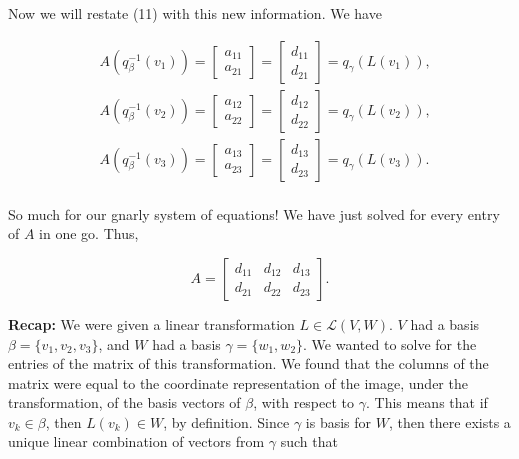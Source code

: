 \documentclass[12pt, a4paper]{article}
\begin{document}
 \noindent Now we will restate (11) with this new information. We have
 
 \begin{equation*}
    \begin{split}
         &A(q_{\beta}^{-1}(v_1))=\begin{bmatrix} a_{11} \\ a_{21} \end{bmatrix} = \begin{bmatrix} d_{11} \\ d_{21} \end{bmatrix} = q_{\gamma}(L(v_1)), \\
         &A(q_{\beta}^{-1}(v_2))=\begin{bmatrix} a_{12} \\ a_{22} \end{bmatrix} = \begin{bmatrix} d_{12} \\ d_{22} \end{bmatrix} = q_{\gamma}(L(v_2)), \\
         &A(q_{\beta}^{-1}(v_3))=\begin{bmatrix} a_{13} \\ a_{23} \end{bmatrix} = \begin{bmatrix} d_{13} \\ d_{23} \end{bmatrix} = q_{\gamma}(L(v_3)). \\
     \end{split}
 \end{equation*}
 
 \vspace{2mm}
 
 \noindent So much for our gnarly system of equations! We have just solved for every entry of $A$ in one go. Thus, 
 
 \begin{equation*}
     A=\begin{bmatrix} d_{11} & d_{12} & d_{13} \\ d_{21} & d_{22} & d_{23} \end{bmatrix}.
 \end{equation*}
 
 \vspace{4mm}
 
 \noindent\textbf{Recap:} We were given a linear transformation $L\in\mathcal{L}(V,W)$. $V$ had a basis $\beta=\{v_1,v_2,v_3\}$, and $W$ had a basis $\gamma=\{w_1,w_2\}$. We wanted to solve for the entries of the matrix of this transformation. We found that the columns of the matrix were equal to the coordinate representation of the image, under the transformation, of the basis vectors of $\beta$, with respect to $\gamma$. This means that if $v_k\in \beta$, then $L(v_k)\in W$, by definition. Since $\gamma$ is basis for $W$, then there exists a unique linear combination of vectors from $\gamma$ such that 
 
\end{document}
